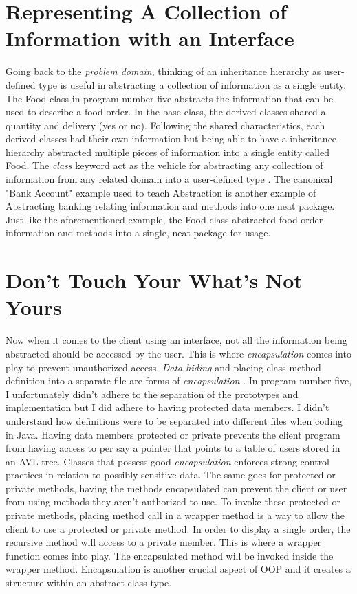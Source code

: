 \documentclass[a4paper,man,biblatex]{apa6}
\begin{document}
\section*{Representing A Collection of Information with an Interface}
Going back to the \textit{problem domain}, thinking of an inheritance hierarchy as user-defined type is useful in abstracting a collection of information as a single entity. The Food class in program number five abstracts the information that can be used to describe a food order. In the base class, the derived classes shared a quantity and delivery (yes or no). Following the shared characteristics, each derived classes had their own information but being able to have a inheritance hierarchy abstracted multiple pieces of information into a single entity called Food. The \textit{class} keyword act as the vehicle for abstracting any collection of information from any related domain into a user-defined type \autocite[508]{prata_c_2012}. The canonical "Bank Account" example used to teach Abstraction is another example of Abstracting banking relating information and methods into one neat package. Just like the aforementioned example, the Food class abstracted food-order information and methods into a single, neat package for usage.
\section*{Don't Touch Your What's Not Yours}
Now when it comes to the client using an interface, not all the information being abstracted should be accessed by the user. This is where \textit{encapsulation} comes into play to prevent unauthorized access. \textit{Data hiding} and placing class method definition into a separate file are forms of \textit{encapsulation} \autocite[512]{prata_c_2012}. In program number five, I unfortunately didn't adhere to the separation of the prototypes and implementation but I did adhere to having protected data members. I didn't understand how definitions were to be separated into different files when coding in Java. Having data members protected or private prevents the client program from having access to per say a pointer that points to a table of users stored in an AVL tree. Classes that possess good \textit{encapsulation} enforces strong control practices in relation to possibly sensitive data. The same goes for protected or private methods, having the methods encapsulated can prevent the client or user from using methods they aren't authorized to use. To invoke these protected or private methods, placing method call in a wrapper method is a way to allow the client to use a protected or private method. In order to display a single order, the recursive method will access to a private member. This is where a wrapper function comes into play. The encapsulated method will be invoked inside the wrapper method. Encapsulation is another crucial aspect of OOP and it creates a structure within an abstract class type.
\end{document}
